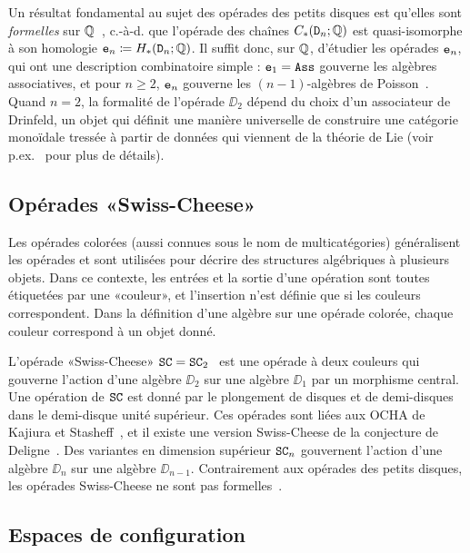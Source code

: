 Un résultat fondamental au sujet des opérades des petits disques est qu'elles sont \emph{formelles} sur $\Q$~\cite{Kontsevich1999,Tamarkin2003,LambrechtsVolic2014,FresseWillwacher2015}, c.-à-d. que l'opérade des chaînes $C_{*}(\DD_{n}; \Q)$ est quasi-isomorphe à son homologie $\en \coloneqq H_{*}(\DD_{n}; \Q)$.
Il suffit donc, sur $\Q$, d'étudier les opérades $\en$, qui ont une description combinatoire simple : $\en[1] = \Ass$ gouverne les algèbres associatives, et pour $n \geq 2$, $\en$ gouverne les $(n-1)$-algèbres de Poisson~\cite{Cohen1976}.
Quand $n = 2$, la formalité de l'opérade $\DD_{2}$ dépend du choix d'un associateur de Drinfeld, un objet qui définit une manière universelle de construire une catégorie monoïdale tressée à partir de données qui viennent de la théorie de Lie (voir p.ex.~\cite[Chapter~I.10]{Fresse2017} pour plus de détails).

\subsection*{Opérades «Swiss-Cheese»}

Les opérades colorées (aussi connues sous le nom de multicatégories) généralisent les opérades et sont utilisées pour décrire des structures algébriques à plusieurs objets.
Dans ce contexte, les entrées et la sortie d'une opération sont toutes étiquetées par une «couleur», et l'insertion n'est définie que si les couleurs correspondent.
Dans la définition d'une algèbre sur une opérade colorée, chaque couleur correspond à un objet donné.



L'opérade «Swiss-Cheese» $\SC = \SC_{2}$~\cite{Voronov1999} est une opérade à deux couleurs qui gouverne l'action d'une algèbre $\DD_{2}$ sur une algèbre $\DD_{1}$ par un morphisme central.
Une opération de $\SC$ est donné par le plongement de disques et de demi-disques dans le demi-disque unité supérieur.
Ces opérades sont liées aux OCHA de Kajiura et Stasheff~\cite{KajiuraStasheff2006a,Hoefel2009}, et il existe une version Swiss-Cheese de la conjecture de Deligne~\cite{DolgushevTamarkinTsygan2011}.
Des variantes en dimension supérieur $\SC_{n}$ gouvernent l'action d'une algèbre $\DD_{n}$ sur une algèbre $\DD_{n-1}$.
Contrairement aux opérades des petits disques, les opérades Swiss-Cheese ne sont pas formelles~\cite{Livernet2015}.

\subsection*{Espaces de configuration}

